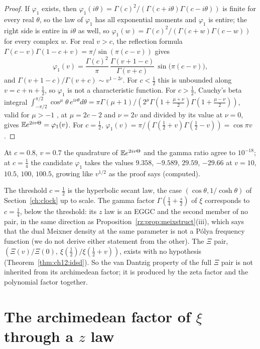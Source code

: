 \begin{proof}
If $\varphi_1$ exists, then $\varphi_1(i\theta)=\Gamma(c)^2/(\Gamma(c+i\theta)\Gamma(c-i\theta))$ is finite for every real $\theta$, so the law of $\varphi_1$ has all exponential moments and $\varphi_1$ is entire; the right side is entire in $i\theta$ as well, so $\varphi_1(w)=\Gamma(c)^2/(\Gamma(c+w)\Gamma(c-w))$ for every complex $w$. For real $v>c$, the reflection formula $\Gamma(c-v)\Gamma(1-c+v)=\pi/\sin(\pi(c-v))$ gives
\[
\varphi_1(v)=\frac{\Gamma(c)^2}\pi\,\frac{\Gamma(v+1-c)}{\Gamma(v+c)}\,\sin\big(\pi(c-v)\big),
\]
and $\Gamma(v+1-c)/\Gamma(v+c)\sim v^{1-2c}$. For $c<\frac12$ this is unbounded along $v=c+n+\frac12$, so $\varphi_1$ is not a characteristic function. For $c>\frac12$, Cauchy's beta integral $\int_{-\pi/2}^{\pi/2}\cos^{\mu}\theta\,e^{i\nu\theta}d\theta=\pi\Gamma(\mu+1)/(2^\mu\Gamma(1+\frac{\mu+\nu}2)\Gamma(1+\frac{\mu-\nu}2))$, valid for $\mu>-1$ \cite[Section 5.12]{DLMF}, at $\mu=2c-2$ and $\nu=2v$ and divided by its value at $\nu=0$, gives $\mathbb{E} e^{2iv\Theta}=\varphi_1(v)$. For $c=\frac12$, $\varphi_1(v)=\pi/(\Gamma(\frac12+v)\Gamma(\frac12-v))=\cos\pi v$.
\end{proof}

At $c=0.8$, $v=0.7$ the quadrature of $\mathbb{E} e^{2iv\Theta}$ and the gamma ratio agree to $10^{-18}$; at $c=\frac14$ the candidate $\varphi_1$ takes the values $9.358$, $-9.589$, $29.59$, $-29.66$ at $v=10$, $10.5$, $100$, $100.5$, growing like $v^{1/2}$ as the proof says (computed).

\begin{remark}\label{zdist:rem:threshold}
The threshold $c=\frac12$ is the hyperbolic secant law, the case $(\cos\theta,1/\cosh\theta)$ of Section~\ref{ch:clock} up to scale. The gamma factor $\Gamma(\frac14+\frac s2)$ of $\xi$ corresponds to $c=\frac14$, below the threshold: its $z$ law is an EGGC and the second member of no pair, in the same direction as Proposition~\ref{rz:prop:meixstruct}(iii), which says that the dual Meixner density at the same parameter is not a P\'olya frequency function (we do not derive either statement from the other). The $\Xi$ pair, $(\Xi(v)/\Xi(0),\ \xi(\frac12)/\xi(\frac12+v))$, exists with no hypothesis (Theorem~\ref{thm:ch12:idsd}). So the van Dantzig property of the full $\Xi$ pair is not inherited from its archimedean factor; it is produced by the zeta factor and the polynomial factor together.
\end{remark}

\section{The archimedean factor of \texorpdfstring{$\xi$}{xi} through a \texorpdfstring{$z$}{z} law}\label{zdist:sec:arch}

